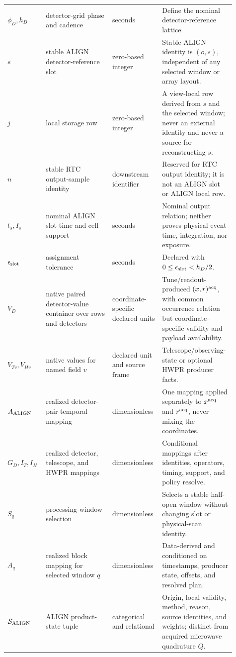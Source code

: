 \begin{longtable}{L{0.16\linewidth}L{0.28\linewidth}L{0.20\linewidth}L{0.27\linewidth}}
\(\phi_D,h_D\) & detector-grid phase and cadence & seconds & Define the nominal detector-reference lattice.\\
\(s\) & stable ALIGN detector-reference slot & zero-based integer & Stable ALIGN identity is \((o,s)\), independent of any selected window or array layout.\\
\(j\) & local storage row & zero-based integer & A view-local row derived from \(s\) and the selected window; never an external identity and never a source for reconstructing \(s\).\\
\(n\) & stable RTC output-sample identity & downstream identifier & Reserved for RTC output identity; it is not an ALIGN slot or ALIGN local row.\\
\(t_s,I_s\) & nominal ALIGN slot time and cell support & seconds & Nominal output relation; neither proves physical event time, integration, nor exposure.\\
\(\epsilon_{\rm slot}\) & assignment tolerance & seconds & Declared with \(0\leq\epsilon_{\rm slot}<h_D/2\).\\
\(V_D\) & native paired detector-value container over rows and detectors & coordinate-specific declared units & Tune/readout-produced \((x,r)^{\rm acq}\), with common occurrence relation but coordinate-specific validity and payload availability.\\
\(V_{Tv},V_{Hv}\) & native values for named field \(v\) & declared unit and source frame & Telescope/observing-state or optional HWPR producer facts.\\
\(A_{\rm ALIGN}\) & realized detector-pair temporal mapping & dimensionless & One mapping applied separately to \(x^{\rm acq}\) and \(r^{\rm acq}\), never mixing the coordinates.\\
\(G_D,I_T,I_H\) & realized detector, telescope, and HWPR mappings & dimensionless & Conditional mappings after identities, operators, timing, support, and policy resolve.\\
\(S_q\) & processing-window selection & dimensionless & Selects a stable half-open window without changing slot or physical-scan identity.\\
\(A_q\) & realized block mapping for selected window \(q\) & dimensionless & Data-derived and conditioned on timestamps, producer state, offsets, and resolved plan.\\
\(\mathcal S_{\rm ALIGN}\) & ALIGN product-state tuple & categorical and relational & Origin, local validity, method, reason, source identities, and weights; distinct from acquired microwave quadrature \(Q\).\\

\end{longtable}
